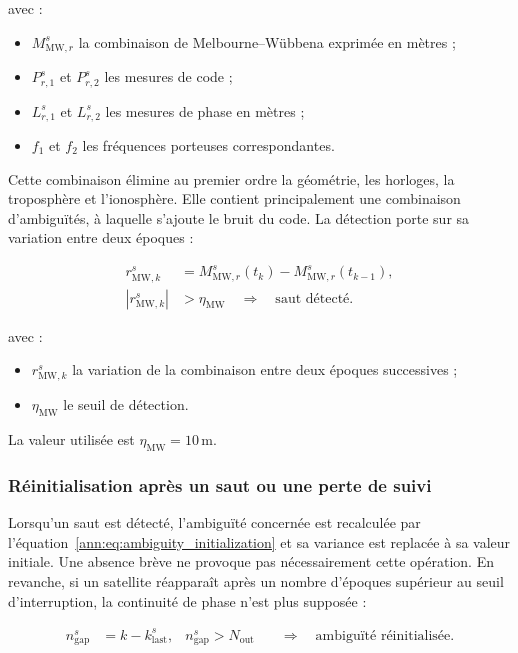 avec :

\begin{itemize}
    \item $M_{\mathrm{MW},r}^s$ la combinaison de Melbourne--Wübbena exprimée
    en mètres ;
    \item $P_{r,1}^s$ et $P_{r,2}^s$ les mesures de code ;
    \item $L_{r,1}^s$ et $L_{r,2}^s$ les mesures de phase en mètres ;
    \item $f_1$ et $f_2$ les fréquences porteuses correspondantes.
\end{itemize}

Cette combinaison élimine au premier ordre la géométrie, les horloges, la
troposphère et l'ionosphère. Elle contient principalement une combinaison
d'ambiguïtés, à laquelle s'ajoute le bruit du code. La détection porte sur sa
variation entre deux époques :

\begin{align}
r_{\mathrm{MW},k}^s
&=
M_{\mathrm{MW},r}^s(t_k)-M_{\mathrm{MW},r}^s(t_{k-1}),
\\
\left|r_{\mathrm{MW},k}^s\right|
&>\eta_{\mathrm{MW}}
\quad\Longrightarrow\quad
\text{saut détecté}.
\label{ann:eq:melbourne_wubbena_detection}
\end{align}

avec :

\begin{itemize}
    \item $r_{\mathrm{MW},k}^s$ la variation de la combinaison entre deux
    époques successives ;
    \item $\eta_{\mathrm{MW}}$ le seuil de détection.
\end{itemize}

La valeur utilisée est $\eta_{\mathrm{MW}}=10\,\mathrm{m}$.

\subsubsection{Réinitialisation après un saut ou une perte de suivi}

Lorsqu'un saut est détecté, l'ambiguïté concernée est recalculée par
l'équation~\eqref{ann:eq:ambiguity_initialization} et sa variance est replacée à sa
valeur initiale. Une absence brève ne provoque pas nécessairement cette
opération. En revanche, si un satellite réapparaît après un nombre d'époques
supérieur au seuil d'interruption, la continuité de phase n'est plus supposée :

\begin{align}
n_{\mathrm{gap}}^s
&=
k-k_{\mathrm{last}}^s,
&
n_{\mathrm{gap}}^s>N_{\mathrm{out}}
&\quad\Longrightarrow\quad
\text{ambiguïté réinitialisée}.
\label{ann:eq:outage_reset}
\end{align}

